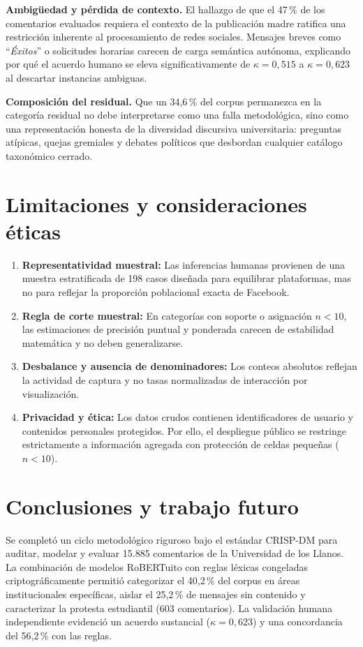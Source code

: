 \documentclass[conference]{IEEEtran}
\newcommand{\pc}{\,\%}
\begin{document}
\textbf{Ambigüedad y p\'erdida de contexto.} El hallazgo de que el 47\pc{} de los comentarios evaluados requiera el contexto de la publicaci\'on madre ratifica una restricci\'on inherente al procesamiento de redes sociales. Mensajes breves como ``\emph{\'Exitos}'' o solicitudes horarias carecen de carga sem\'antica aut\'onoma, explicando por qu\'e el acuerdo humano se eleva significativamente de $\kappa = 0,515$ a $\kappa = 0,623$ al descartar instancias ambiguas.

\textbf{Composici\'on del residual.} Que un 34,6\pc{} del corpus permanezca en la categor\'ia residual no debe interpretarse como una falla metodol\'ogica, sino como una representaci\'on honesta de la diversidad discursiva universitaria: preguntas at\'ipicas, quejas gremiales y debates pol\'iticos que desbordan cualquier cat\'alogo taxon\'omico cerrado.

\section{Limitaciones y consideraciones \'eticas}
\begin{enumerate}
\item \textbf{Representatividad muestral:} Las inferencias humanas provienen de una muestra estratificada de 198 casos dise\~nada para equilibrar plataformas, mas no para reflejar la proporci\'on poblacional exacta de Facebook.
\item \textbf{Regla de corte muestral:} En categor\'ias con soporte o asignaci\'on $n < 10$, las estimaciones de precisi\'on puntual y ponderada carecen de estabilidad matem\'atica y no deben generalizarse.
\item \textbf{Desbalance y ausencia de denominadores:} Los conteos absolutos reflejan la actividad de captura y no tasas normalizadas de interacci\'on por visualizaci\'on.
\item \textbf{Privacidad y \'etica:} Los datos crudos contienen identificadores de usuario y contenidos personales protegidos. Por ello, el despliegue p\'ublico se restringe estrictamente a informaci\'on agregada con protecci\'on de celdas peque\~nas ($n < 10$).
\end{enumerate}

\section{Conclusiones y trabajo futuro}
Se complet\'o un ciclo metodol\'ogico riguroso bajo el est\'andar CRISP-DM para auditar, modelar y evaluar 15.885 comentarios de la Universidad de los Llanos. La combinaci\'on de modelos RoBERTuito con reglas l\'exicas congeladas criptogr\'aficamente permiti\'o categorizar el 40,2\pc{} del corpus en \'areas institucionales espec\'ificas, aislar el 25,2\pc{} de mensajes sin contenido y caracterizar la protesta estudiantil (603 comentarios). La validaci\'on humana independiente evidenci\'o un acuerdo sustancial ($\kappa = 0,623$) y una concordancia del 56,2\pc{} con las reglas.
\end{document}
